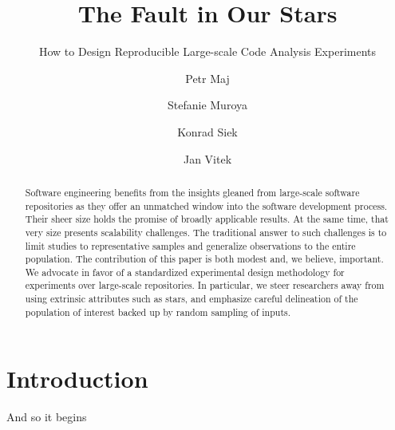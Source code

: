 \documentclass[sigconf,review,anonymous]{acmart}
\begin{document}
\title{The Fault in Our Stars}
\subtitle{How to Design Reproducible Large-scale Code Analysis Experiments}

\author{Petr Maj}
\author{Stefanie Muroya}
\author{Konrad Siek}
\author{Jan Vitek}

\renewcommand{\shortauthors}{Maj, Murroya, et al.}

\renewcommand{\c}[1]{\lstinline|#1|\xspace}

\begin{abstract}
  Software engineering benefits from the insights gleaned from large-scale
  software repositories as they offer an unmatched window into the software
  development process. Their sheer size holds the promise of broadly applicable
  results. At the same time, that very size presents scalability challenges. The
  traditional answer to such challenges is to limit studies to representative
  samples and generalize observations to the entire population. The contribution
  of this paper is both modest and, we believe, important. We advocate in favor
  of a standardized experimental design methodology for experiments over large-scale
  repositories. In particular, we steer researchers away from using extrinsic
  attributes such as stars, and emphasize careful delineation of the population
  of interest backed up by random sampling of inputs.
\end{abstract}
\maketitle

\section{Introduction}

And so it begins
\end{document}
